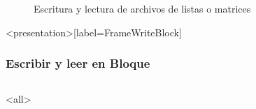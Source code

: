 \begin{figure}
  \caption{\protect\label{FigWriteBlock} Escritura y lectura de archivos de listas o matrices}
\end{figure}

\mode*

\begin{frame}<presentation>[label=FrameWriteBlock]
  \frametitle{Escribir y leer en Bloque}

  \begin{columns}[t]
    \begin{codeblock}
      
    \end{codeblock}

    \tiny

    
  \end{columns}

\end{frame}

\mode<all>
